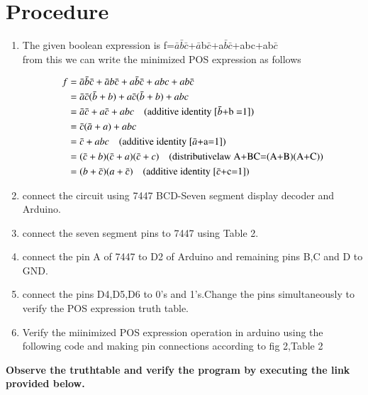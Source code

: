 \documentclass[journal,12pt,twocolumn]{IEEEtran}
\begin{document}
\section{\textbf{Procedure}}
\begin{enumerate}
\item The given boolean expression is f=$\bar{a}$$\bar{b}$$\bar{c}$+$\bar{a}$b$\bar{c}$+a$\bar{b}$$\bar{c}$+abc+ab$\bar{c}$\\
from this we can write the minimized POS expression as follows

\begin{align*}
f&={\bar{a}}\bar{b}\bar{c}+\bar{a}b\bar{c}+a\bar{b}\bar{c}+abc+ab\bar{c}\\[\parskip]
&=\bar{a}\bar{c}(\bar{b}+b)+a\bar{c}(\bar{b}+b)+abc\\[\parskip]
&=\bar{a}\bar{c}+a\bar{c}+abc \quad\text{(additive identity [$\bar{b}$+b =1])}\\[\parskip]
&=\bar{c}(\bar{a}+a)+abc\\[\parskip]
&=\bar{c}+abc \quad\text{(additive identity [$\bar{a}$+a=1])}\\[\parskip]
&=(\bar{c}+b)(\bar{c}+a)(\bar{c}+c) \quad\text{(distributivelaw A+BC=(A+B)(A+C))}\\[\parskip]
&=(b+\bar{c})(a+\bar{c}) \quad\text{(additive identity [$\bar{c}$+c=1])}
\end{align*}

\item connect the circuit using 7447 BCD-Seven segment display decoder and Arduino.\\
\item connect the seven segment pins to 7447 using Table 2.\\
\item connect the pin A of 7447 to D2 of Arduino and remaining pins B,C and D to GND.\\ 
\item connect the pins D4,D5,D6 to 0's and 1's.Change the pins simultaneously to verify the POS expression truth table.\\
\item Verify the miinimized POS expression operation in arduino using the following code and making pin connections according to fig 2,Table 2\\
\end{enumerate}

\textbf{Observe the truthtable and verify the program by executing the link provided below.}\\
\begin{center}
\end{center}
\end{document}
